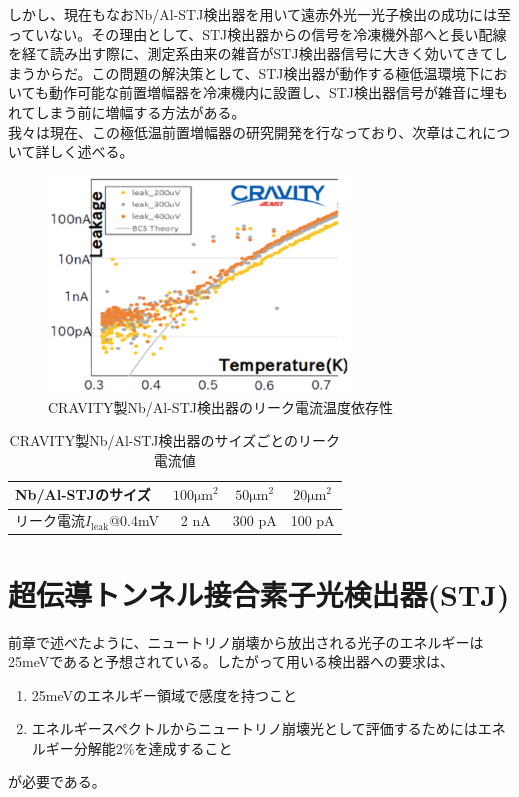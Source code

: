 		しかし、現在もなおNb/Al-STJ検出器を用いて遠赤外光一光子検出の成功には至っていない。その理由として、STJ検出器からの信号を冷凍機外部へと長い配線を経て読み出す際に、測定系由来の雑音がSTJ検出器信号に大きく効いてきてしまうからだ。この問題の解決策として、STJ検出器が動作する極低温環境下においても動作可能な前置増幅器を冷凍機内に設置し、STJ検出器信号が雑音に埋もれてしまう前に増幅する方法がある。\\
		我々は現在、この極低温前置増幅器の研究開発を行なっており、次章はこれについて詳しく述べる。
		\begin{figure}[htbp]
  			\begin{center}
  				\includegraphics[width=8.0cm]{./Chapter/Chapter2/Picture/NbAlSTJ_leaktemp.eps}
    				\caption{CRAVITY製Nb/Al-STJ検出器のリーク電流温度依存性}
	  			\label{fig:NbAlSTJ_leaktemp}
 			\end{center}
		\end{figure}
		\begin{table}[htb]
			\begin{center}
				\caption{CRAVITY製Nb/Al-STJ検出器のサイズごとのリーク電流値}
				\begin{tabular}{| l || c | c | c |} \hline
					Nb/Al-STJのサイズ & ${100 \mathrm{\mu m}}^2$ & ${50 \mathrm{\mu m}}^2$ & ${20 \mathrm{\mu m}}^2$ \\ \hline
					リーク電流$I_{\mathrm{leak}}$@0.4mV & 2 nA & 300 pA & 100 pA \\ \hline
				\end{tabular}
				\label{tab:NbAlSTJ_leaksize}
			\end{center}
		\end{table}




\chapter{超伝導トンネル接合素子光検出器(STJ)}
前章で述べたように、ニュートリノ崩壊から放出される光子のエネルギーは25meVであると予想されている。したがって用いる検出器への要求は、
\begin{enumerate}
\item 25meVのエネルギー領域で感度を持つこと
\item エネルギースペクトルからニュートリノ崩壊光として評価するためにはエネルギー分解能$2 \%$を達成すること
\end{enumerate}
が必要である。

